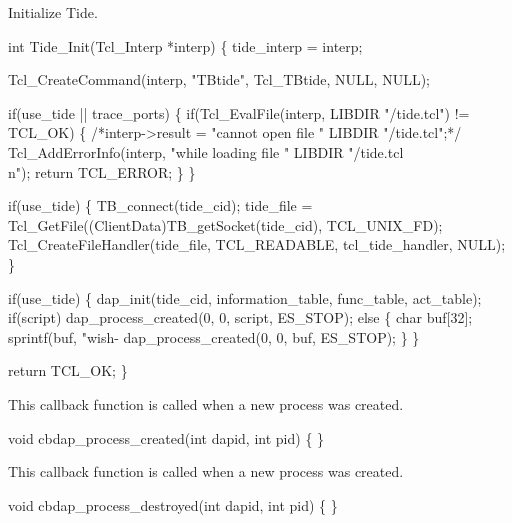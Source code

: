 
Initialize Tide.

\nwenddocs{}\endmoddef\let\nwnotused=\nwoutput{}
int Tide_Init(Tcl_Interp *interp)
\{
  tide_interp = interp;

  Tcl_CreateCommand(interp, "TBtide", Tcl_TBtide, NULL, NULL);

  if(use_tide || trace_ports) \{
    if(Tcl_EvalFile(interp, LIBDIR "/tide.tcl") != TCL_OK) \{
      /*interp->result = "cannot open file " LIBDIR "/tide.tcl";*/
      Tcl_AddErrorInfo(interp, "while loading file " LIBDIR "/tide.tcl\\n");
      return TCL_ERROR;
    \}
  \}

  if(use_tide) \{
    TB_connect(tide_cid);
    tide_file = Tcl_GetFile((ClientData)TB_getSocket(tide_cid), TCL_UNIX_FD);
    Tcl_CreateFileHandler(tide_file, TCL_READABLE, tcl_tide_handler, NULL);
  \}

  if(use_tide) \{
    dap_init(tide_cid, information_table, func_table, act_table);
    if(script)
      dap_process_created(0, 0, script, ES_STOP);
    else \{
      char buf[32];
      sprintf(buf, "wish-%
      dap_process_created(0, 0, buf, ES_STOP);
    \}
  \}

  return TCL_OK;
\}
\nwendcode{}\nwdocspar



This callback function is called when a new process was created.

\nwenddocs{}\endmoddef\let\nwnotused=\nwoutput{}
void cbdap_process_created(int dapid, int pid)
\{
\}
\nwendcode{}\nwdocspar


This callback function is called when a new process was created.

\nwenddocs{}\endmoddef\let\nwnotused=\nwoutput{}
void cbdap_process_destroyed(int dapid, int pid)
\{
\}
\nwendcode{}\nwdocspar

